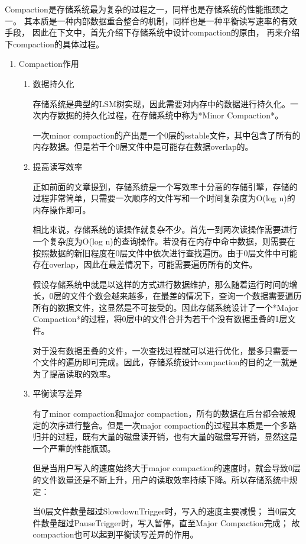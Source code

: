 		Compaction是存储系统最为复杂的过程之一，同样也是存储系统的性能瓶颈之一。
		其本质是一种内部数据重合整合的机制，同样也是一种平衡读写速率的有效手段，
		因此在下文中，首先介绍下存储系统中设计compaction的原由，
		再来介绍下compaction的具体过程。

		\begin{enumerate}
			\item Compaction作用
			\begin{enumerate}
				\item 数据持久化

				存储系统是典型的LSM树实现，因此需要对内存中的数据进行持久化。一次内存数据的持久化过程，在存储系统中称为*Minor Compaction*。
				
				一次minor compaction的产出是一个0层的sstable文件，其中包含了所有的内存数据。但是若干个0层文件中是可能存在数据overlap的。
				
				\item 提高读写效率
				
				正如前面的文章提到，存储系统是一个写效率十分高的存储引擎，存储的过程非常简单，只需要一次顺序的文件写和一个时间复杂度为O(log n)的内存操作即可。
				
				相比来说，存储系统的读操作就复杂不少。首先一到两次读操作需要进行一个复杂度为O(log n)的查询操作。若没有在内存中命中数据，则需要在按照数据的新旧程度在0层文件中依次进行查找遍历。由于0层文件中可能存在overlap，因此在最差情况下，可能需要遍历所有的文件。
				
				假设存储系统中就是以这样的方式进行数据维护，那么随着运行时间的增长，0层的文件个数会越来越多，在最差的情况下，查询一个数据需要遍历所有的数据文件，这显然是不可接受的。因此存储系统设计了一个*Major Compaction*的过程，将0层中的文件合并为若干个没有数据重叠的1层文件。
				
				对于没有数据重叠的文件，一次查找过程就可以进行优化，最多只需要一个文件的遍历即可完成。因此，存储系统设计compaction的目的之一就是为了提高读取的效率。
				
				\item 平衡读写差异
				
				有了minor compaction和major compaction，所有的数据在后台都会被规定的次序进行整合。但是一次major compaction的过程其本质是一个多路归并的过程，既有大量的磁盘读开销，也有大量的磁盘写开销，显然这是一个严重的性能瓶颈。
				
				但是当用户写入的速度始终大于major compaction的速度时，就会导致0层的文件数量还是不断上升，用户的读取效率持续下降。所以存储系统中规定：
				
				当0层文件数量超过SlowdownTrigger时，写入的速度主要减慢；
				当0层文件数量超过PauseTrigger时，写入暂停，直至Major Compaction完成；
				故compaction也可以起到平衡读写差异的作用。
				

\end{enumerate}
\end{enumerate}

